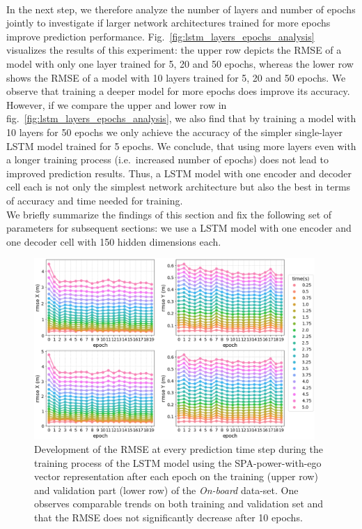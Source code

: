 \\
In the next step, we therefore analyze the number of layers and number of epochs jointly to investigate if larger network architectures trained for more epochs improve prediction performance.
Fig.~\ref{fig:lstm_layers_epochs_analysis} visualizes the results of this experiment: the upper row depicts the \ac{RMSE} of a model with only one layer trained for \num{5}, \num{20} and \num{50} epochs, whereas the lower row shows the \ac{RMSE} of a model with \num{10} layers trained for \num{5}, \num{20} and \num{50} epochs. 
We observe that training a deeper model for more epochs does improve its accuracy.
However, if we compare the upper and lower row in fig.~\ref{fig:lstm_layers_epochs_analysis}, we also find that by training a model with \num{10} layers for \num{50} epochs we only achieve the accuracy of the simpler single-layer \ac{LSTM} model trained for \num{5} epochs.
We conclude, that using more layers even with a longer training process (i.e.\ increased number of epochs) does not lead to improved prediction results.
Thus, a \ac{LSTM} model with one encoder and decoder cell each is not only the simplest network architecture but also the best in terms of accuracy and time needed for training.
\\
We briefly summarize the findings of this section and fix the following set of parameters for subsequent sections: we use a \ac{LSTM} model with one encoder and one decoder cell with \num{150} hidden dimensions each.

\begin{figure}[t!]
  \centering
  \includegraphics[width=0.95\textwidth]{imgs/rmse_dev_over_epochs.eps}
  \caption{Development of the \ac{RMSE} at every prediction time step during the training process of the \ac{LSTM} model using the \ac{SPA}-power-with-ego vector representation after each epoch on the training (upper row) and validation part (lower row) of the \emph{On-board} data-set. One observes comparable trends on both training and validation set and that the \ac{RMSE} does not significantly decrease after \num{10} epochs.}\label{fig:rmse_dev_over_epochs}
\end{figure}



